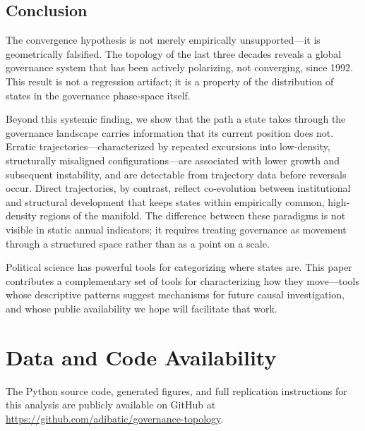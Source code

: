 \documentclass[12pt]{article}
\begin{document}
\subsection{Conclusion}

The convergence hypothesis is not merely empirically unsupported—it is geometrically falsified. The topology of the last three decades reveals a global governance system that has been actively polarizing, not converging, since 1992. This result is not a regression artifact; it is a property of the distribution of states in the governance phase-space itself.

Beyond this systemic finding, we show that the path a state takes through the governance landscape carries information that its current position does not. Erratic trajectories—characterized by repeated excursions into low-density, structurally misaligned configurations—are associated with lower growth and subsequent instability, and are detectable from trajectory data before reversals occur. Direct trajectories, by contrast, reflect co-evolution between institutional and structural development that keeps states within empirically common, high-density regions of the manifold. The difference between these paradigms is not visible in static annual indicators; it requires treating governance as movement through a structured space rather than as a point on a scale.

Political science has powerful tools for categorizing where states are. This paper contributes a complementary set of tools for characterizing how they move—tools whose descriptive patterns suggest mechanisms for future causal investigation, and whose public availability we hope will facilitate that work.

\section*{Data and Code Availability}
The Python source code, generated figures, and full replication instructions for this analysis are publicly available on GitHub at \url{https://github.com/adibatic/governance-topology}.



\end{document}
